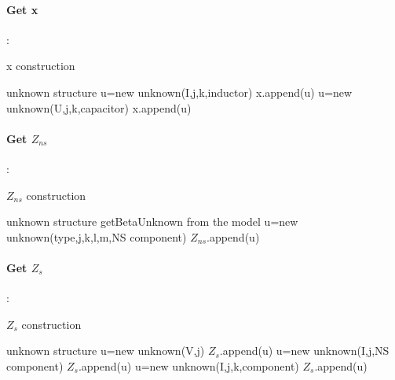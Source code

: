 \documentclass[10pt]{article}
\begin{document}
\paragraph{Get x}:

\begin{algorithm}
\caption{x construction}
\begin{algorithmic}
\REQUIRE unknown structure
\STATE u=new unknown(I,j,k,inductor)
\STATE x.append(u)
\ENDFOR
{}
\STATE u=new unknown(U,j,k,capacitor)
\STATE x.append(u)
\ENDIF
\ENDFOR
\end{algorithmic}
\end{algorithm}
\paragraph{Get $Z_{ns}$}:

\begin{algorithm}
\caption{$Z_{ns}$ construction}
\begin{algorithmic}
\REQUIRE unknown structure
\STATE getBetaUnknown from the model
\STATE u=new unknown(type,j,k,l,m,NS component)
\STATE $Z_{ns}$.append(u)
\ENDFOR
\end{algorithmic}
\end{algorithm}

\paragraph{Get $Z_{s}$}:

\begin{algorithm}
\caption{$Z_{s}$ construction}
\begin{algorithmic}
\REQUIRE unknown structure
\STATE u=new unknown(V,j)
\STATE $Z_{s}$.append(u)
\ENDFOR
{}
\STATE u=new unknown(I,j,NS component)
\STATE $Z_{s}$.append(u)
\ENDFOR
\ENDFOR
{}
\STATE u=new unknown(I,j,k,component)
\STATE $Z_{s}$.append(u)
\ENDFOR

\end{algorithmic}
\end{algorithm}
\newpage
\end{document}
